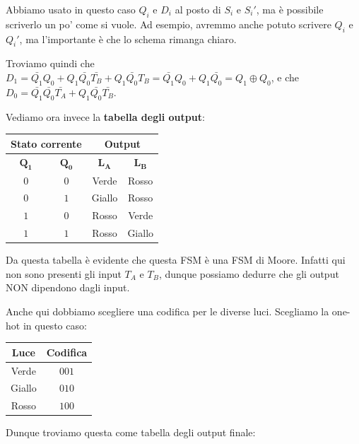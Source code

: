 \documentclass[11pt, a4paper, titlepage, oneside]{scrbook}
\begin{document}
\NB Abbiamo usato in questo caso $Q_i$ e $D_i$ al posto di $S_i$ e $S_i'$, ma è possibile scriverlo un po' come si vuole. Ad esempio, avremmo anche potuto scrivere $Q_i$ e $Q_i'$, ma l'importante è che lo schema rimanga chiaro.

Troviamo quindi che \mbox{$D_1 = \bar{Q_1} Q_0 + Q_1 \bar{Q_0} \bar{T_B} + Q_1 \bar{Q_0} T_B = \bar{Q_1} Q_0 + Q_1 \bar{Q_0} = Q_1 \oplus Q_0 $}, e che \mbox{$D_0 = \bar{Q_1} \bar{Q_0} \bar{T_A} + Q_1 \bar{Q_0} \bar{T_B}$}.

Vediamo ora invece la \textbf{tabella degli output}:

\begin{table}[H]
  \centering
  \begin{tabular}{|c|c|c|c|}
    \hline
    \multicolumn{2}{|c|}{\textbf{Stato corrente}} &
    \multicolumn{2}{c|}{\textbf{Output}} \\
    \hline
    $\bm{Q_1}$ & $\bm{Q_0}$ & $\bm{L_A}$ & $\bm{L_B}$ \\
    \hline
    $0$ & $0$ & Verde & Rosso \\
    $0$ & $1$ & Giallo & Rosso \\
    $1$ & $0$ & Rosso & Verde \\
    $1$ & $1$ & Rosso & Giallo \\
    \hline
  \end{tabular}
\end{table}

Da questa tabella è evidente che questa FSM è una FSM di Moore. Infatti qui non sono presenti gli input $T_A$ e $T_B$, dunque possiamo dedurre che gli output NON dipendono dagli input. 

Anche qui dobbiamo scegliere una codifica per le diverse luci. Scegliamo la one-hot in questo caso:

\begin{table}[H]
  \centering
  \begin{tabular}{|c|c|}
    \hline
    \textbf{Luce} & \textbf{Codifica} \\
    \hline
    Verde & $001$ \\
    Giallo & $010$ \\
    Rosso & $100$ \\ \hline
  \end{tabular}
\end{table}

Dunque troviamo questa come tabella degli output finale:
\end{document}
